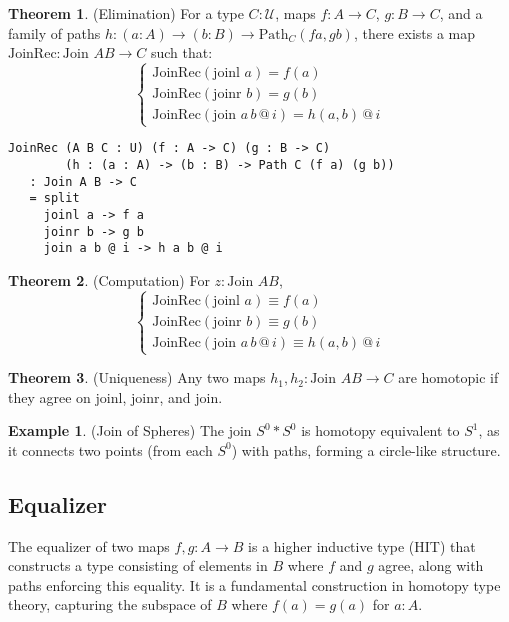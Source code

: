 \documentclass{article}
\theoremstyle{definition}
\newtheorem{theorem}{Theorem}
\newtheorem{example}{Example}
\begin{document}
\begin{theorem} (Elimination)
For a type $C : \mathcal{U}$, maps $f : A \to C$, $g : B \to C$,
and a family of paths $h : (a : A) \to (b : B) \to \text{Path}_C (f a, g b)$,
there exists a map $\text{JoinRec} : \text{Join } A B \to C$ such that:
\[
\begin{cases}
\text{JoinRec}(\text{joinl } a) = f(a) \\
\text{JoinRec}(\text{joinr } b) = g(b) \\
\text{JoinRec}(\text{join } a \, b \, @ \, i) = h(a, b) \, @ \, i
\end{cases}
\]
\begin{lstlisting}
JoinRec (A B C : U) (f : A -> C) (g : B -> C)
        (h : (a : A) -> (b : B) -> Path C (f a) (g b))
   : Join A B -> C
   = split
     joinl a -> f a
     joinr b -> g b
     join a b @ i -> h a b @ i
\end{lstlisting}
\end{theorem}

\begin{theorem} (Computation)
For $z : \text{Join } A B$,
\[
\begin{cases}
\text{JoinRec}(\text{joinl } a) \equiv f(a) \\
\text{JoinRec}(\text{joinr } b) \equiv g(b) \\
\text{JoinRec}(\text{join } a \, b \, @ \, i) \equiv h(a, b) \, @ \, i
\end{cases}
\]
\end{theorem}

\begin{theorem} (Uniqueness)
Any two maps $h_1, h_2 : \text{Join } A B \to C$ are homotopic
if they agree on $\text{joinl}$, $\text{joinr}$, and $\text{join}$.
\end{theorem}

\begin{example} (Join of Spheres)
The join $S^0 * S^0$ is homotopy equivalent to $S^1$, as it connects
two points (from each $S^0$) with paths, forming a circle-like structure.
\end{example}

\newpage
\subsection{Equalizer}
The equalizer of two maps $f, g : A \to B$ is a higher inductive
type (HIT) that constructs a type consisting of elements in $B$
where $f$ and $g$ agree, along with paths enforcing this equality.
It is a fundamental construction in homotopy type theory,
capturing the subspace of $B$ where $f(a) = g(a)$ for $a : A$.
\end{document}
